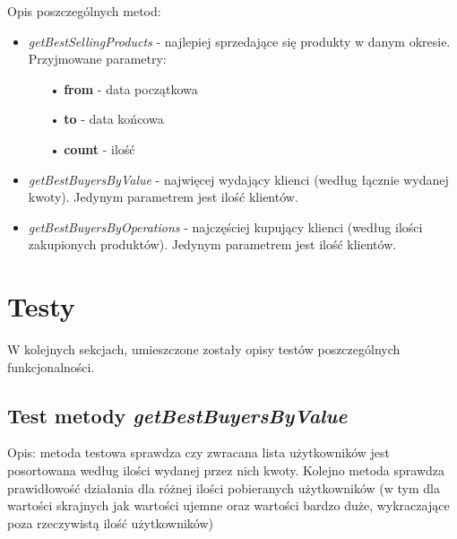 \documentclass[a4paper,11pt,notitlepage]{article}
\begin{document}
Opis poszczególnych metod:

\begin{itemize}
	\item \textit{getBestSellingProducts} - najlepiej sprzedające się produkty w danym okresie. Przyjmowane parametry:
		\begin{itemize}
			\item[•] \textbf{from} - data początkowa
			\item[•] \textbf{to} - data końcowa
			\item[•] \textbf{count} - ilość 
		\end{itemize}
	\item \textit{getBestBuyersByValue} - najwięcej wydający klienci (według łącznie wydanej kwoty). Jedynym parametrem jest ilość klientów.
	\item \textit{getBestBuyersByOperations} - najczęściej kupujący klienci (według ilości zakupionych produktów). Jedynym parametrem jest ilość klientów.
\end{itemize}

\section{Testy}

W kolejnych sekcjach, umieszczone zostały opisy testów poszczególnych funkcjonalności.

\subsection{Test metody \textit{getBestBuyersByValue}}

Opis: metoda testowa sprawdza czy zwracana lista użytkowników jest posortowana według ilości wydanej przez nich kwoty. Kolejno metoda sprawdza prawidłowość działania dla różnej ilości pobieranych użytkowników (w tym dla wartości skrajnych jak wartości ujemne oraz wartości bardzo duże, wykraczające poza rzeczywistą ilość użytkowników)
\end{document}
